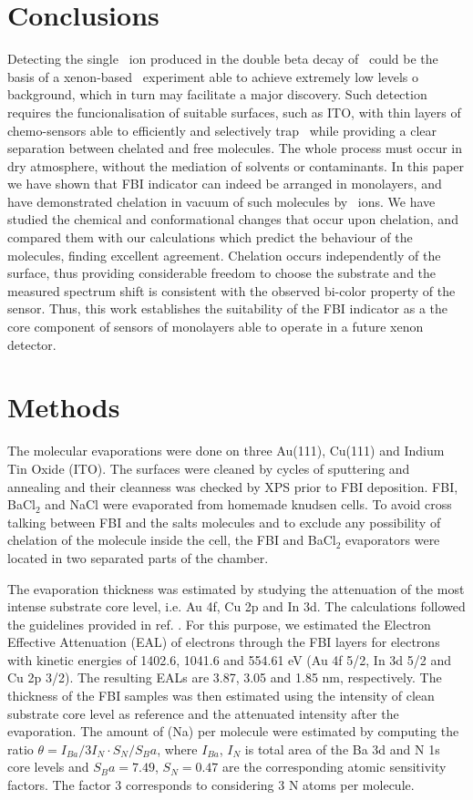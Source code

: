 \documentclass[aps,prl,reprint,longbibliography,superscriptaddress, english]{revtex4-1}
\def\BappCl{BaCl$_2$ }
\begin{document}
\section{Conclusions}
Detecting the single \Bapp\ ion produced in the double beta decay of \XE\ could be the basis of a xenon-based \bbonu\ experiment able to achieve extremely low levels o background, which in turn may facilitate a major discovery. Such detection requires the funcionalisation of suitable surfaces, such as ITO, with thin layers of chemo-sensors able to efficiently and selectively trap \Bapp\ while providing a clear separation between chelated and free molecules. The whole process must occur in dry atmosphere, without the mediation of solvents or contaminants. In this paper we have shown that FBI indicator can indeed be arranged in monolayers, and have demonstrated chelation in vacuum of such molecules by \Bapp\ ions. We have studied the chemical and conformational changes that occur upon chelation, and compared them with our calculations which predict the behaviour of the molecules, finding excellent agreement. Chelation occurs independently of the surface, thus providing considerable freedom to choose the substrate and the measured spectrum shift is consistent with the observed bi-color property of the sensor. Thus, this work establishes the suitability of the FBI indicator as a the core component of sensors of monolayers able to operate in a future xenon detector. 

\section{Methods}

 The molecular evaporations were done on three Au(111), Cu(111) and Indium Tin Oxide (ITO). The surfaces were cleaned by cycles of sputtering and annealing and their cleanness was checked by XPS prior to FBI deposition. FBI, \BappCl and NaCl were evaporated from homemade knudsen cells. To avoid cross talking between FBI and the salts molecules and to exclude any possibility of chelation of the molecule inside the cell, the FBI and \BappCl  evaporators were located in two separated parts of the chamber.
 
The evaporation thickness was estimated by studying the attenuation of the most intense substrate core level, i.e. Au 4f, Cu 2p and In 3d. The calculations followed the guidelines provided in ref. \cite{powell_practical_2020}. For this purpose, we estimated the Electron Effective Attenuation (EAL) of electrons through the FBI layers for electrons with kinetic energies of 1402.6, 1041.6 and 554.61 eV (Au 4f 5/2, In 3d 5/2 and Cu 2p 3/2). The resulting EALs are 3.87, 3.05 and 1.85 nm, respectively. The thickness of the FBI samples was then estimated using the intensity of clean substrate core level as reference and the attenuated intensity after the evaporation. The amount of \Bapp (Na) per molecule were estimated by computing  the ratio $\theta=I_{Ba}/3I_N \cdot S_N/S_Ba $, where $I_{Ba}$, $I_N$ is total area  of the  Ba 3d  and  N 1s  core  levels and $S_Ba = 7.49$, $S_N = 0.47$ are the corresponding atomic sensitivity factors\cite{Moulder1992HandbookOX}. The factor 3 corresponds to considering 3 N atoms per molecule.
\end{document}
